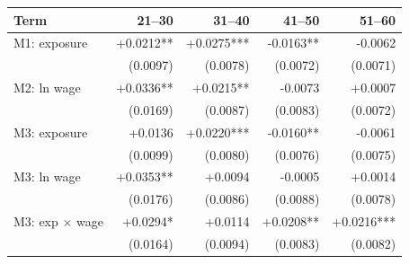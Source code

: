 \begin{tabular}{lrrrr}
\toprule
Term & 21–30 & 31–40 & 41–50 & 51–60 \\
\midrule
M1: exposure & +0.0212** & +0.0275*** & -0.0163** & -0.0062 \\
 & (0.0097) & (0.0078) & (0.0072) & (0.0071) \\
M2: ln wage & +0.0336** & +0.0215** & -0.0073 & +0.0007 \\
 & (0.0169) & (0.0087) & (0.0083) & (0.0072) \\
M3: exposure & +0.0136 & +0.0220*** & -0.0160** & -0.0061 \\
 & (0.0099) & (0.0080) & (0.0076) & (0.0075) \\
M3: ln wage & +0.0353** & +0.0094 & -0.0005 & +0.0014 \\
 & (0.0176) & (0.0086) & (0.0088) & (0.0078) \\
M3: exp $\times$ wage & +0.0294* & +0.0114 & +0.0208** & +0.0216*** \\
 & (0.0164) & (0.0094) & (0.0083) & (0.0082) \\
\bottomrule
\end{tabular}